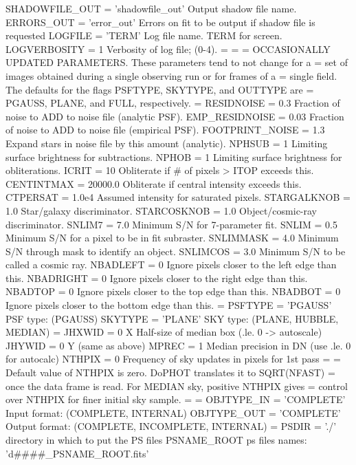 {{SHADOWFILE\_OUT = 'shadowfile\_out'    Output shadow file name.
ERRORS\_OUT = 'error\_out'  Errors on fit to be output if shadow file is requested
LOGFILE = 'TERM'                     Log file name.  TERM for screen.
LOGVERBOSITY = 1                     Verbosity of log file; (0-4).
=
=
=  OCCASIONALLY UPDATED PARAMETERS.  These parameters tend to not change for a 
=  set of images obtained during a single observing run or for frames of a 
=  single field.  The defaults for the flags PSFTYPE, SKYTYPE, and OUTTYPE are
=  PGAUSS, PLANE, and FULL, respectively.
=
RESIDNOISE = 0.3       Fraction of noise to ADD to noise file (analytic PSF).
EMP\_RESIDNOISE = 0.03  Fraction of noise to ADD to noise file (empirical PSF).
FOOTPRINT\_NOISE = 1.3  Expand stars in noise file by this amount (analytic).
NPHSUB = 1             Limiting surface brightness for subtractions.
NPHOB = 1              Limiting surface brightness for obliterations.
ICRIT = 10             Obliterate if \# of pixels > ITOP exceeds this.
CENTINTMAX = 20000.0   Obliterate if central intensity exceeds this.
CTPERSAT = 1.0e4       Assumed intensity for saturated pixels.
STARGALKNOB = 1.0      Star/galaxy discriminator.
STARCOSKNOB = 1.0      Object/cosmic-ray discriminator.
SNLIM7 = 7.0           Minimum S/N for 7-parameter fit.
SNLIM = 0.5            Minimum S/N for a pixel to be in fit subraster.
SNLIMMASK = 4.0        Minimum S/N through mask to identify an object.
SNLIMCOS  = 3.0        Minimum S/N to be called a cosmic ray.
NBADLEFT = 0           Ignore pixels closer to the left edge than this.
NBADRIGHT = 0          Ignore pixels closer to the right edge than this.
NBADTOP = 0            Ignore pixels closer to the top edge than this.
NBADBOT = 0            Ignore pixels closer to the bottom edge than this.
=
PSFTYPE = 'PGAUSS'        PSF type: (PGAUSS)
SKYTYPE = 'PLANE'         SKY type: (PLANE, HUBBLE, MEDIAN)
=
JHXWID = 0              X Half-size of median box (.le. 0 -> autoscale)
JHYWID = 0              Y (same as above)
MPREC = 1               Median precision in DN (use .le. 0 for autocalc)
NTHPIX = 0              Frequency of sky updates in pixels for 1st pass
=
= Default value of NTHPIX is zero. DoPHOT translates it to SQRT(NFAST)
= once the data frame is read. For MEDIAN sky, positive NTHPIX gives
= control over NTHPIX for finer initial sky sample. 
=
=
OBJTYPE\_IN = 'COMPLETE'   Input format: (COMPLETE, INTERNAL)
OBJTYPE\_OUT = 'COMPLETE'  Output format: (COMPLETE, INCOMPLETE, INTERNAL)
=
PSDIR = './'               directory in which to put the PS files 
PSNAME\_ROOT                ps files names: 'd\#\#\#\#\_PSNAME\_ROOT.fits'
}}
